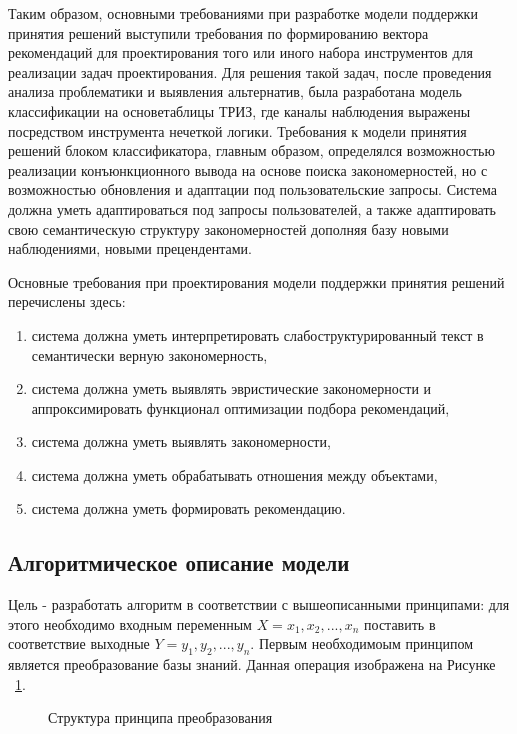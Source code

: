 Таким образом, основными требованиями при разработке модели поддержки принятия решений выступили требования по формированию вектора рекомендаций для проектирования того или иного набора инструментов для реализации задач проектирования. Для решения такой задач, после проведения анализа проблематики и выявления альтернатив, была разработана модель классификации на основетаблицы ТРИЗ, где каналы наблюдения выражены посредством инструмента нечеткой логики. Требования к модели принятия решений блоком классификатора, главным образом, определялся возможностью реализации конъюнкционного вывода на основе поиска закономерностей, но с возможностью обновления и адаптации под пользовательские запросы. Система должна уметь адаптироваться под запросы пользователей, а также адаптировать свою семантическую структуру закономерностей дополняя базу новыми наблюдениями, новыми прецендентами.

Основные требования при проектирования модели поддержки принятия решений перечислены здесь:

\begin{enumerate}
	\item система должна уметь интерпретировать слабоструктурированный текст в семантически верную закономерность,
	\item система должна уметь выявлять эвристические закономерности и аппроксимировать функционал оптимизации подбора рекомендаций,
	\item система должна уметь выявлять закономерности,
	\item система должна уметь обрабатывать отношения между объектами,
	\item система должна уметь формировать рекомендацию.
\end{enumerate}


\subsection{Алгоритмическое описание модели}\label{sec:ch2/sec4/sub2}

Цель - разработать алгоритм в соответствии с вышеописанными принципами:
для этого необходимо входным переменным $X = {x_1, x_2, ..., x_n}$ поставить в соответствие выходные $Y = {y_1, y_2, ..., y_n}$. Первым необходимоым принципом является преобразование базы знаний. Данная операция изображена на Рисунке ~\cref{fig:NNprin}.
\begin{figure}[ht]
    \caption{Структура принципа преобразования}\label{fig:NNprin}
\end{figure}

